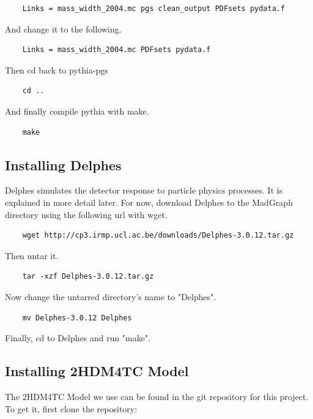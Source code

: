 \documentclass{article}
\begin{document}
\begin{verbatim}
	Links = mass_width_2004.mc pgs clean_output PDFsets pydata.f
\end{verbatim}

And change it to the following.

\begin{verbatim}
	Links = mass_width_2004.mc PDFsets pydata.f
\end{verbatim}

Then cd back to pythia-pgs

\begin{verbatim}
	cd ..
\end{verbatim}

And finally compile pythia with make.

\begin{verbatim}
	make
\end{verbatim}

\subsection{Installing Delphes}

Delphes simulates the detector response to particle physics processes. It is explained in more detail later. For now, download Delphes to the MadGraph directory using the following url with wget.

\begin{verbatim}
	wget http://cp3.irmp.ucl.ac.be/downloads/Delphes-3.0.12.tar.gz
\end{verbatim}

Then untar it.

\begin{verbatim}
	tar -xzf Delphes-3.0.12.tar.gz
\end{verbatim}

Now change the untarred directory's name to "Delphes".

\begin{verbatim}
	mv Delphes-3.0.12 Delphes
\end{verbatim}

Finally, cd to Delphes and run "make".

\subsection{Installing 2HDM4TC Model}

The 2HDM4TC Model we use can be found in the git repository for this project. To get it, first clone the repository:
\end{document}
